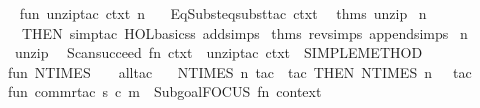 \begin{isabellebody}
\endisatagproof
{\isafoldproof}%
%
\isadelimproof
\isanewline
%
\endisadelimproof
%
\isadelimML
\isanewline
%
\endisadelimML
%
\isatagML
{}\isamarkupfalse%
\ {}\isanewline
fun\ unzip{}tac\ ctxt\ n\ {}\isanewline
\ \ EqSubst{}eqsubst{}tac\ ctxt\ {}{}{}\ %
\isaantiq
thms\ unzip{}%
\endisaantiq
\ n\isanewline
\ \ THEN\ simp{}tac\ {}HOL{}basic{}ss\ addsimps\ %
\isaantiq
thms\ rev{}simps\ append{}simps{}%
\endisaantiq
{}\ n\isanewline
{}\isanewline
\isanewline
{}\isamarkupfalse%
\ unzip\ {}\ {}\isanewline
Scan{}succeed\ {}fn\ ctxt\ {}{}\ unzip{}tac\ ctxt\ {}{}\ SIMPLE{}METHOD{}{}\isanewline
{}\isanewline
\isanewline
{}\isamarkupfalse%
\ {}\isanewline
fun\ NTIMES\ {}\ {}\ {}\ all{}tac\isanewline
\ \ {}\ NTIMES\ n\ tac\ {}\ tac\ THEN\ {}NTIMES\ {}n\ {}\ {}{}\ tac{}\isanewline
\isanewline
fun\ commr{}tac\ s\ c\ m\ {}\ Subgoal{}FOCUS\ {}fn\ {}context{}\ {}{}{}{}\ {}{}\isanewline

\end{isabellebody}
